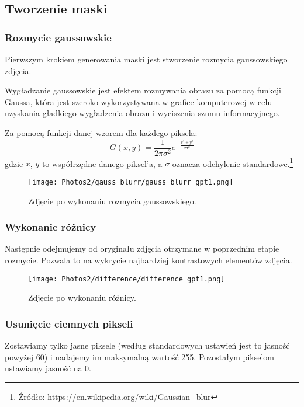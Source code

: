 \documentclass[]{mwart}
\begin{document}
\subsection{Tworzenie maski}
\subsubsection{Rozmycie gaussowskie}
Pierwszym krokiem generowania maski jest stworzenie rozmycia gaussowskiego zdjęcia.

Wygładzanie gaussowskie jest efektem rozmywania obrazu za pomocą funkcji Gaussa,
która jest szeroko wykorzystywana w grafice komputerowej w celu uzyskania gładkiego
wygładzenia obrazu i wyciszenia szumu informacyjnego.

Za pomocą funkcji danej wzorem dla każdego piksela:
\begin{equation}
    G(x, y) = \frac{1}{2 \pi \sigma^2}e^{- \frac{x^2+y^2}{2\sigma^2}}
\end{equation}
gdzie $x$, $y$ to współrzędne danego piksel'a, a $\sigma$ oznacza odchylenie standardowe.\footnote{Źródło: \url{https://en.wikipedia.org/wiki/Gaussian_blur}}

\begin{figure}[H]
    \centering
    \texttt{[image: Photos2/gauss\_blurr/gauss\_blurr\_gpt1.png]}
    \caption{Zdjęcie po wykonaniu rozmycia gaussowskiego.}
\end{figure}

\subsubsection{Wykonanie różnicy}
Następnie odejmujemy od oryginału zdjęcia otrzymane w poprzednim etapie rozmycie.
Pozwala to na wykrycie najbardziej kontrastowych elementów zdjęcia.

\begin{figure}[H]
    \centering
    \texttt{[image: Photos2/difference/difference\_gpt1.png]}
    \caption{Zdjęcie po wykonaniu różnicy.}
\end{figure}

\subsubsection{Usunięcie ciemnych pikseli}
Zostawiamy tylko jasne piksele (według standardowych ustawień jest
to jasność powyżej 60) i nadajemy im maksymalną wartość 255.
Pozostałym pikselom ustawiamy jasność na 0.
\end{document}
